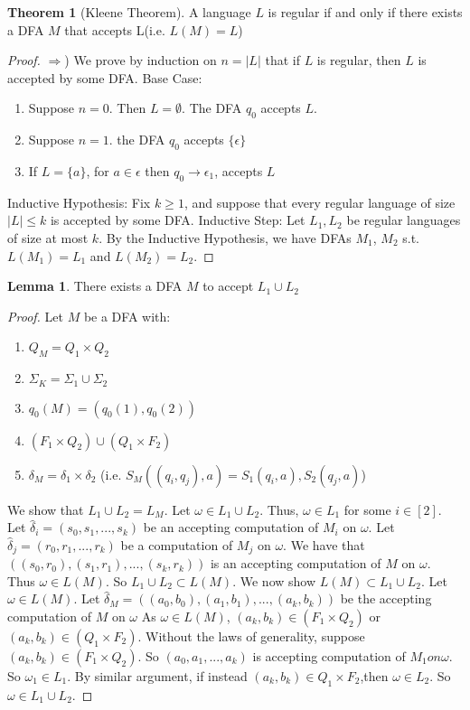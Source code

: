 \documentclass{article}
\theoremstyle{definition}
\newtheorem{thm}{Theorem}[section]
\newtheorem{lem}{Lemma}[section]
\begin{document}
\begin{thm}[Kleene Theorem]
A language $L$ is regular if and only if there exists a DFA $M$ that accepts L(i.e. $L(M)=L$)
\end{thm}
\begin{proof}
$\Rightarrow$) We prove by induction on $n=|L|$ that if $L$ is regular, then $L$ is accepted by some DFA. Base Case: 
	\begin{enumerate}
		\item Suppose $n=0$. Then $L=\emptyset$. The DFA $q_0$ accepts $L$.
		\item Suppose $n=1$.	 the DFA $q_0$ accepts $\{\epsilon\}$
		\item If $L=\{a\}$, for $a \in \epsilon$ then $q_0 \rightarrow \epsilon_1$, accepts $L$ 
	\end{enumerate}
Inductive Hypothesis: Fix $k \geq 1$, and suppose that every regular language of size $|L| \leq k$ is accepted by some DFA. Inductive Step: Let $L_1, L_2$ be regular languages of size at most $k$. By the Inductive Hypothesis, we have DFAs $M_1$, $M_2$ s.t. $L(M_1)=L_1$ and $L(M_2)=L_2$.
\end{proof}

\begin{lem}
There exists a DFA $M$ to accept $L_1 \cup L_2$
\end{lem}
\begin{proof}
Let $M$ be a DFA with:
	\begin{enumerate}
		\item $Q_M=Q_1 \times Q_2$
		\item $\Sigma_K = \Sigma_1 \cup \Sigma_2$
		\item $q_0(M)=(q_0(1),q_0(2))$
		\item $(F_1 \times Q_2)\cup (Q_1 \times F_2)$
		\item $\delta_M = \delta_1 \times \delta_2$ (i.e. $S_M((q_i,q_j),a)=S_1(q_i,a),S_2(q_j,a)$)
	\end{enumerate} 
We show that $L_1 \cup L_2 = L_M$. Let $\omega \in L_1\cup L_2$. Thus, $\omega \in L_1$ for some $i\in [2]$. Let $\hat{\delta}_i=(s_0,s_1,...,s_k)$ be an accepting computation of $M_i$ on $\omega$. Let $\hat{\delta}_j=(r_0,r_1,...,r_k)$ be a computation of $M_j$ on $\omega$. We have that $((s_0,r_0),(s_1,r_1),...,(s_k,r_k))$ is an accepting computation of $M$ on $\omega$. Thus $\omega \in L(M)$. So $L_1\cup L_2 \subset L(M)$. We now show $L(M)\subset L_1\cup L_2$. Let $\omega \in L(M)$. Let $\hat{\delta}_M =((a_0,b_0),(a_1,b_1),...,(a_k,b_k))$ be the accepting computation of $M$ on $\omega$ As $\omega \in L(M)$, $(a_k,b_k)\in(F_1\times Q_2)$ or $(a_k,b_k)\in (Q_1\times F_2)$. Without the laws of generality, suppose $(a_k,b_k)\in(F_1\times Q_2)$. So $(a_0,a_1,...,a_k)$ is accepting computation of $M_1 on \omega$. So $\omega_1\in L_1$. By similar argument, if instead $(a_k,b_k)\in Q_1 \times F_2$,then $\omega \in L_2$. So $\omega \in L_1\cup L_2$.
\end{proof}
\end{document}
